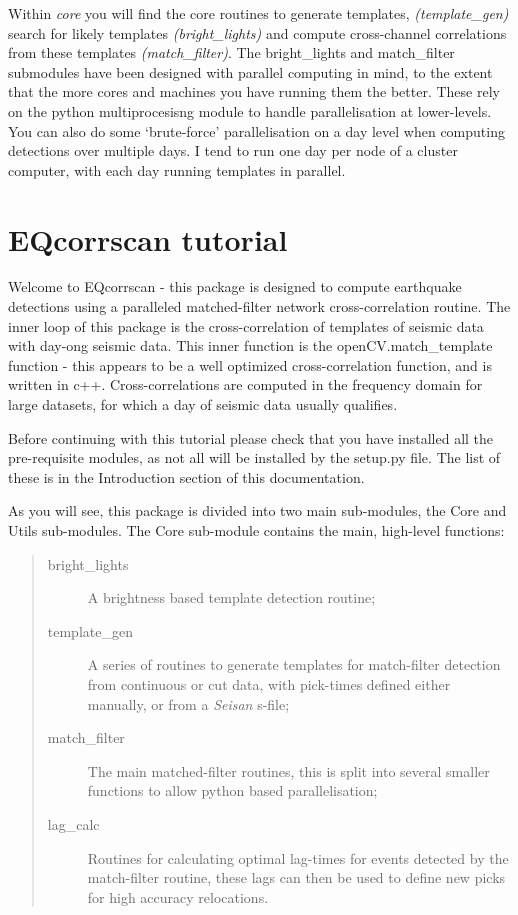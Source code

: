 \documentclass[a4paper,10pt,english]{sphinxmanual}
\begin{document}
Within \emph{core} you will find the core routines to generate templates,
\emph{(template\_gen)} search for likely templates \emph{(bright\_lights)} and
compute cross-channel correlations from these templates \emph{(match\_filter)}.  The
bright\_lights and match\_filter submodules have been designed with parallel
computing in mind, to the extent that the more cores and machines you have
running them the better.  These rely on the python multiprocesisng module to
handle parallelisation at lower-levels.  You can also do some `brute-force'
parallelisation on a day level when computing detections over multiple days.
I tend to run one day per node of a cluster computer, with each day running
templates in parallel.


\section{EQcorrscan tutorial}
\label{tutorial:eqcorrscan-tutorial}\label{tutorial::doc}
Welcome to EQcorrscan - this package is designed to compute earthquake detections
using a paralleled matched-filter network cross-correlation routine.  The inner
loop of this package is the cross-correlation of templates of seismic data
with day-ong seismic data.  This inner function is the openCV.match\_template
function - this appears to be a well optimized cross-correlation function, and
is written in c++.  Cross-correlations are computed in the frequency domain
for large datasets, for which a day of seismic data usually qualifies.

Before continuing with this tutorial please check that you have installed all
the pre-requisite modules, as not all will be installed by the setup.py file.
The list of these is in the Introduction section of this documentation.

As you will see, this package is divided into two main sub-modules, the
Core and Utils sub-modules.  The Core sub-module contains the main, high-level
functions:
\begin{quote}\begin{description}
\item[{bright\_lights}] \leavevmode
A brightness based template detection routine;

\item[{template\_gen}] \leavevmode
A series of routines to generate templates for match-filter detection
from continuous or cut data, with pick-times defined either manually, or from a
\emph{Seisan} s-file;

\item[{match\_filter}] \leavevmode
The main matched-filter routines, this is split into several
smaller functions to allow python based parallelisation;

\item[{lag\_calc}] \leavevmode
Routines for calculating optimal lag-times for events detected
by the match-filter routine, these lags can then be used to define new picks
for high accuracy relocations.

\end{description}\end{quote}
\end{document}

